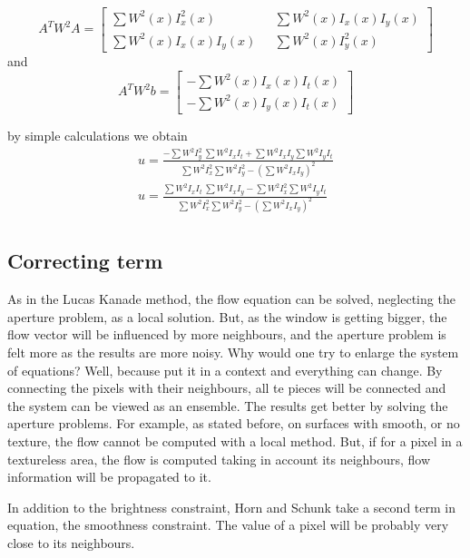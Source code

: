 \documentclass[12pt,a4paper,twoside]{report}
\begin{document}
\begin{equation}
A^T W^2 A = 
\begin{bmatrix}
\sum W^2(x)I_x^2(x) \ \ \  
&\sum W^2(x)I_x(x) I_y(x) \\
\sum W^2(x)I_x(x) I_y(x) \ \ \  
&\sum W^2(x)I_y^2(x) 
\end{bmatrix}
\end{equation}
and
\begin{equation}
A^T W^2 b = 
\begin{bmatrix}
-\sum W^2(x)I_x(x)I_t(x)   \\
-\sum W^2(x)I_y(x) I_t(x)  

\end{bmatrix}
\end{equation}
 
by simple calculations we obtain
\begin{equation}
\begin{split}
	u =\frac{-\sum W^2I_y^2\ \sum W^2I_xI_t 
		+ \sum W^2I_x I_y  \sum W^2I_yI_t }
	{\sum W^2 I_x^2 \sum W^2 I_y^2
		- (\sum W^2 I_x I_y)^2 } \\
	u =\frac{\sum W^2I_x I_t\ \sum W^2I_xI_y 
		 - \sum W^2I_x^2  \sum W^2I_yI_t }
	{\sum W^2 I_x^2 \sum W^2 I_y^2
		- (\sum W^2 I_x I_y)^2 } \\
\end{split}
\end{equation}

\subsection{Correcting term}
As in the Lucas Kanade method, the flow equation can be solved, neglecting the aperture problem, as a local solution. But, as the window is getting bigger, the flow vector will be influenced by more neighbours, and the aperture problem is felt more as the results are more noisy. Why would one try to enlarge the system of equations? Well, because put it in a context and everything can change. By connecting the pixels with their neighbours, all te pieces will be connected and the system can be viewed as an ensemble. The results get better by solving the aperture problems. For example, as stated before, on surfaces with smooth, or no texture, the flow cannot be computed with a local method. But, if for a pixel in a textureless area, the flow is computed taking in account its neighbours, flow information will be propagated to it.

In addition to the brightness constraint, Horn and Schunk take a second term in equation, the smoothness constraint. The value of a pixel will be probably very close to its neighbours.
\end{document}
